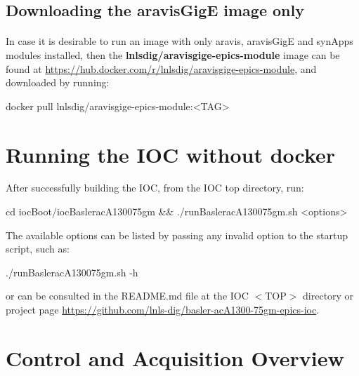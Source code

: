 \documentclass[openany]{article}
\begin{document}
    \subsection{Downloading the aravisGigE image only}

        \paragraph{} In case it is desirable to run an image with only aravis, aravisGigE and synApps modules installed, then the \textbf{lnlsdig/aravisgige-epics-module} image can be found at \url{https://hub.docker.com/r/lnlsdig/aravisgige-epics-module}, and downloaded by running:

        \vspace{1mm}
        \begin{code}
docker pull lnlsdig/aravisgige-epics-module:<TAG>
        \end{code}
        \vspace{1mm}

\section{Running the IOC without docker}

    After successfully building the IOC, from the IOC top directory, run:

        \vspace{1mm}
        \begin{code}
cd iocBoot/iocBasleracA130075gm &&
./runBasleracA130075gm.sh <options>
        \end{code}
        \vspace{1mm}

    The available options can be listed by passing any invalid option to the startup script, such as:

        \vspace{1mm}
        \begin{code}
./runBasleracA130075gm.sh -h
        \end{code}
        \vspace{1mm}

    or can be consulted in the README.md file at the IOC $<$TOP$>$ directory or project page \url{https://github.com/lnls-dig/basler-acA1300-75gm-epics-ioc}.

\section{Control and Acquisition Overview}
\end{document}
